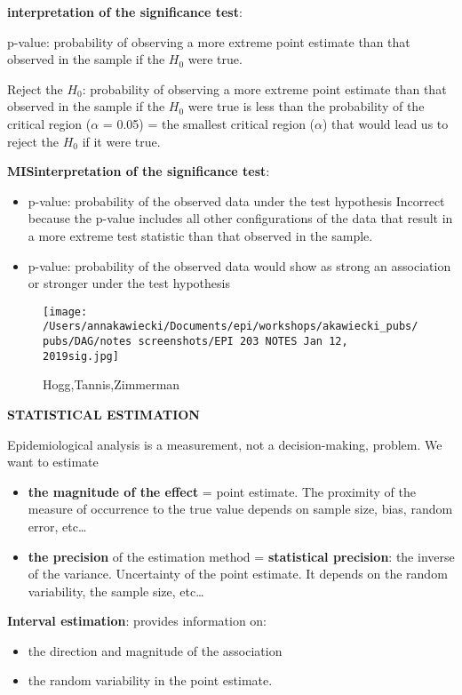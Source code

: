 \documentclass[
]{article}
\providecommand{\tightlist}{%
  \setlength{\itemsep}{0pt}\setlength{\parskip}{0pt}}
\begin{document}
\textbf{interpretation of the significance test}:

p-value: probability of observing a more extreme point estimate than
that observed in the sample if the \(H_0\) were true.

Reject the \(H_0\): probability of observing a more extreme point
estimate than that observed in the sample if the \(H_0\) were true is
less than the probability of the critical region (\(\alpha\) = 0.05) =
the smallest critical region (\(\alpha\)) that would lead us to reject
the \(H_0\) if it were true.

\textbf{MISinterpretation of the significance test}:

\begin{itemize}
\item
  p-value: probability of the observed data under the test hypothesis
  Incorrect because the p-value includes all other configurations of the
  data that result in a more extreme test statistic than that observed
  in the sample.
\item
  p-value: probability of the observed data would show as strong an
  association or stronger under the test hypothesis
\end{itemize}

\begin{figure}
\centering
\texttt{[image: /Users/annakawiecki/Documents/epi/workshops/akawiecki\_pubs/pubs/DAG/notes screenshots/EPI 203 NOTES Jan 12, 2019sig.jpg]}
\caption{Hogg,Tannis,Zimmerman}
\end{figure}

\textbf{STATISTICAL ESTIMATION}

Epidemiological analysis is a measurement, not a decision-making,
problem. We want to estimate

\begin{itemize}
\item
  \textbf{the magnitude of the effect} = point estimate. The proximity
  of the measure of occurrence to the true value depends on sample size,
  bias, random error, etc\ldots{}
\item
  \textbf{the precision} of the estimation method = \textbf{statistical
  precision}: the inverse of the variance. Uncertainty of the point
  estimate. It depends on the random variability, the sample size,
  etc\ldots{}
\end{itemize}

\textbf{Interval estimation}: provides information on:

\begin{itemize}
\tightlist
\item
  the direction and magnitude of the association
\item
  the random variability in the point estimate.
\end{itemize}
\end{document}

